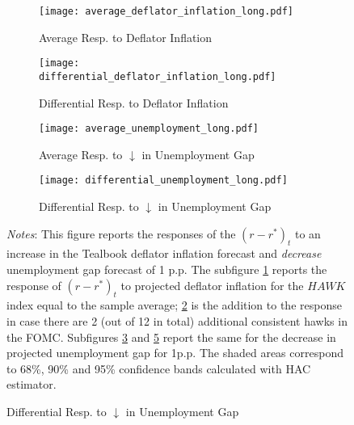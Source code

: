 \documentclass[11pt]{article}
\begin{document}
\begin{figure}[!htbp]\centering
  \begin{minipage}{.9\textwidth}
  \caption{Policy Response to Projected Deflator Inflation and Unemployment Gap and FOMC Hawkishness. Long Specification}\vspace{2ex}
  \label{fig:LP_long}
  \begin{subfigure}[b]{0.495\textwidth}
      \centering
      \caption{Average Resp. to Deflator Inflation}
      \label{fig:LP_long:average_inflation}
      \texttt{[image: average\_deflator\_inflation\_long.pdf]}
  \end{subfigure}
  \hfill
  \begin{subfigure}[b]{0.495\textwidth}
      \centering
      \caption{Differential Resp. to Deflator Inflation }
      \label{fig:LP_long:differential_inflation}
      \texttt{[image: differential\_deflator\_inflation\_long.pdf]}
  \end{subfigure}\vspace{2ex}
  \begin{subfigure}[b]{0.49\textwidth}\centering
    \caption{Average Resp. to $\downarrow$ in Unemployment Gap}
    \label{fig:LP_long:average_gap}
    \texttt{[image: average\_unemployment\_long.pdf]}
  \end{subfigure}  
  \hfill
  \begin{subfigure}[b]{0.49\textwidth}\centering
    \caption{Differential Resp. to $\downarrow$ in Unemployment Gap}
    \label{fig:LP_long:differential_gap}
    \texttt{[image: differential\_unemployment\_long.pdf]}
  \end{subfigure}
      {\begin{flushleft}\scriptsize\textit{Notes}: This figure reports the responses of the $(r-r^*)_t$ to an increase in the Tealbook deflator inflation forecast and \emph{decrease} unemployment gap forecast of 1 p.p.
      The subfigure \ref{fig:LP_long:average_inflation} reports the response of $(r-r^*)_t$ to projected deflator inflation for the $\mathit{HAWK}$ index equal to the sample average; 
      \ref{fig:LP_long:differential_inflation} is the addition to the response in case there are 2 (out of 12 in total) additional consistent hawks in the FOMC. 
      Subfigures \ref{fig:LP_long:average_gap} and \ref{fig:LP_long:differential_gap} report the same for the decrease in projected unemployment gap for 1p.p. 
      The shaded areas correspond to 68\%, 90\% and 95\% confidence bands calculated with \citet{Andrews1991} HAC estimator.\end{flushleft}}
\end{minipage}
\end{figure}
\end{document}
